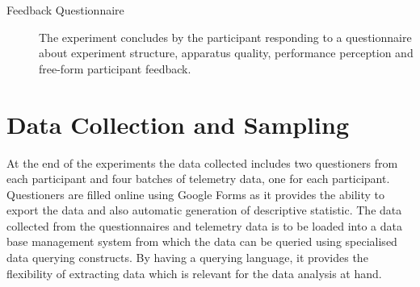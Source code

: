\begin{description}
	
	\item[Feedback Questionnaire] The experiment concludes by the participant responding to a questionnaire about experiment structure, apparatus quality, performance perception and free-form participant feedback.
	
	
\end{description}

\section{Data Collection and Sampling}
\label{sec:meth-data-gathering}
At the end of the experiments the data collected includes two questioners from each participant and four batches of telemetry data, one for each participant. Questioners are filled online using Google Forms as it provides the ability to export the data and also automatic generation of descriptive statistic. The data collected from the questionnaires and telemetry data is to be loaded into a data base management system from which the data can be queried using specialised data querying constructs. By having a querying language, it provides the flexibility of extracting data which is relevant for the data analysis at hand.

